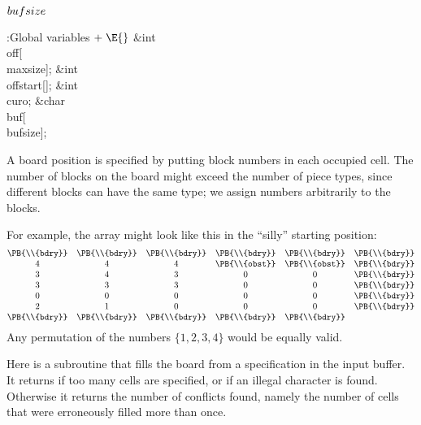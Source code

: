 \B\D$\\{bufsize}$ \5
\par
\Y\B\4:Global variables\X${}\mathrel+\E{}$\6
\&{int} \\{off}[\\{maxsize}];\6
\&{int} \\{offstart}[];\6
\&{int} \\{curo};\6
\&{char} \\{buf}[\\{bufsize}];\par
\fi

A board position is specified by putting block numbers in each occupied
cell. The number of blocks on the board might exceed the number of piece
types, since different blocks can have the same type; we assign numbers
arbitrarily to the blocks.

For example, the  array might look like this in the ``silly''
starting position:
$$\vbox{\halign{\hfil#\hfil&&\quad\hfil#\hfil\cr
\PB{\\{bdry}}&\PB{\\{bdry}}&\PB{\\{bdry}}&\PB{\\{bdry}}&\PB{\\{bdry}}&\PB{%
\\{bdry}}\cr
4&4&4&\PB{\\{obst}}&\PB{\\{obst}}&\PB{\\{bdry}}\cr
3&4&3&0&0&\PB{\\{bdry}}\cr
3&3&3&0&0&\PB{\\{bdry}}\cr
0&0&0&0&0&\PB{\\{bdry}}\cr
2&1&0&0&0&\PB{\\{bdry}}\cr
\PB{\\{bdry}}&\PB{\\{bdry}}&\PB{\\{bdry}}&\PB{\\{bdry}}&\PB{\\{bdry}}\cr}}$$
Any permutation of the numbers $\{1,2,3,4\}$ would be equally valid.

\fi

Here is a subroutine that fills the board from a specification in
the input buffer. It returns  if too many cells are specified,
or  if an illegal character is found.
Otherwise it returns the number of conflicts found, namely the
number of cells that were erroneously filled more than once.

